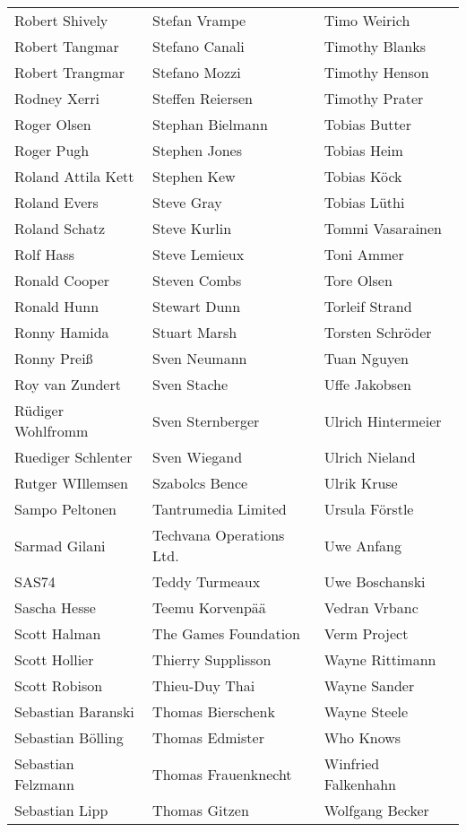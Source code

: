 \begin{small}
\begin{tabular}{p{4cm}p{4cm}p{4cm}}
Robert Shively & Stefan Vrampe & Timo Weirich \\
Robert Tangmar & Stefano Canali & Timothy Blanks \\
Robert Trangmar & Stefano Mozzi & Timothy Henson \\
Rodney Xerri & Steffen Reiersen & Timothy Prater \\
Roger Olsen & Stephan Bielmann & Tobias Butter \\
Roger Pugh & Stephen Jones & Tobias Heim \\
Roland Attila Kett & Stephen Kew & Tobias Köck \\
Roland Evers & Steve Gray & Tobias Lüthi \\
Roland Schatz & Steve Kurlin & Tommi Vasarainen \\
Rolf Hass & Steve Lemieux & Toni Ammer \\
Ronald Cooper & Steven Combs & Tore Olsen \\
Ronald Hunn & Stewart Dunn & Torleif Strand \\
Ronny Hamida & Stuart Marsh & Torsten Schröder \\
Ronny Preiß & Sven Neumann & Tuan Nguyen \\
Roy van Zundert & Sven Stache & Uffe Jakobsen \\
Rüdiger Wohlfromm & Sven Sternberger & Ulrich Hintermeier \\
Ruediger Schlenter & Sven Wiegand & Ulrich Nieland \\
Rutger WIllemsen & Szabolcs Bence & Ulrik Kruse \\
Sampo Peltonen & Tantrumedia Limited & Ursula Förstle \\
Sarmad Gilani & Techvana Operations Ltd. & Uwe Anfang \\
SAS74 & Teddy Turmeaux & Uwe Boschanski \\
Sascha Hesse & Teemu Korvenpää & Vedran Vrbanc \\
Scott Halman & The Games Foundation & Verm Project \\
Scott Hollier & Thierry Supplisson & Wayne Rittimann \\
Scott Robison & Thieu-Duy Thai & Wayne Sander \\
Sebastian Baranski & Thomas Bierschenk & Wayne Steele \\
Sebastian Bölling & Thomas Edmister & Who Knows \\
Sebastian Felzmann & Thomas Frauenknecht & Winfried Falkenhahn \\
Sebastian Lipp & Thomas Gitzen & Wolfgang Becker \\

\end{tabular}
\end{small}
